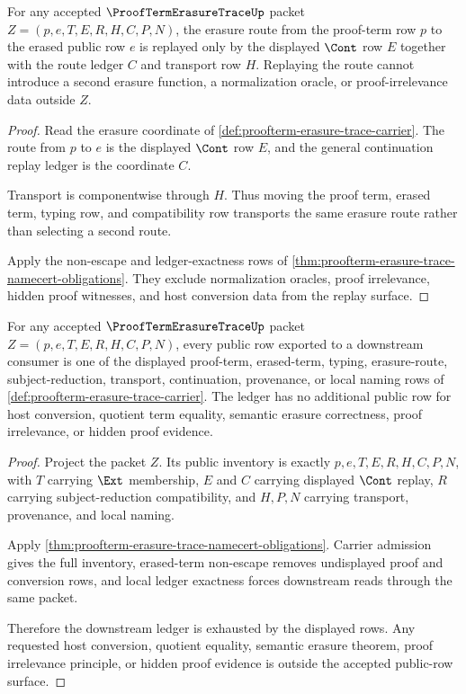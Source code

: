 \begin{theorem}
\label{thm:proofterm-erasure-trace-erasure-route-replay}
For any accepted $\ProofTermErasureTraceUp$ packet $Z=(p,e,T,E,R,H,C,P,N)$, the erasure route from the proof-term row $p$ to the erased public row $e$ is replayed only by the displayed $\Cont$ row $E$ together with the route ledger $C$ and transport row $H$. Replaying the route cannot introduce a second erasure function, a normalization oracle, or proof-irrelevance data outside $Z$.
\end{theorem}
\begin{proof}
Read the erasure coordinate of \autoref{def:proofterm-erasure-trace-carrier}. The route from $p$ to $e$ is the displayed $\Cont$ row $E$, and the general continuation replay ledger is the coordinate $C$.

Transport is componentwise through $H$. Thus moving the proof term, erased term, typing row, and compatibility row transports the same erasure route rather than selecting a second route.

Apply the non-escape and ledger-exactness rows of \autoref{thm:proofterm-erasure-trace-namecert-obligations}. They exclude normalization oracles, proof irrelevance, hidden proof witnesses, and host conversion data from the replay surface.
\end{proof}

\begin{theorem}
\label{thm:proofterm-erasure-trace-public-row-ledger-exhaustion}
For any accepted $\ProofTermErasureTraceUp$ packet $Z=(p,e,T,E,R,H,C,P,N)$, every public row exported to a downstream consumer is one of the displayed proof-term, erased-term, typing, erasure-route, subject-reduction, transport, continuation, provenance, or local naming rows of \autoref{def:proofterm-erasure-trace-carrier}. The ledger has no additional public row for host conversion, quotient term equality, semantic erasure correctness, proof irrelevance, or hidden proof evidence.
\end{theorem}
\begin{proof}
Project the packet $Z$. Its public inventory is exactly $p,e,T,E,R,H,C,P,N$, with $T$ carrying $\Ext$ membership, $E$ and $C$ carrying displayed $\Cont$ replay, $R$ carrying subject-reduction compatibility, and $H,P,N$ carrying transport, provenance, and local naming.

Apply \autoref{thm:proofterm-erasure-trace-namecert-obligations}. Carrier admission gives the full inventory, erased-term non-escape removes undisplayed proof and conversion rows, and local ledger exactness forces downstream reads through the same packet.

Therefore the downstream ledger is exhausted by the displayed rows. Any requested host conversion, quotient equality, semantic erasure theorem, proof irrelevance principle, or hidden proof evidence is outside the accepted public-row surface.
\end{proof}

